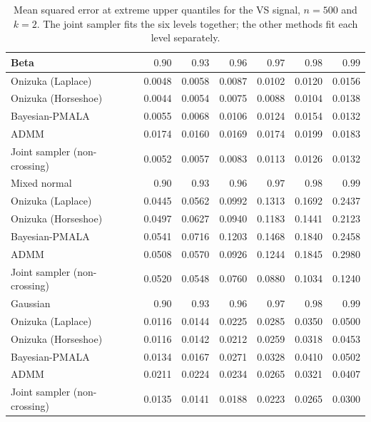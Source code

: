 \begin{table}[!htbp]
\centering
\small
\caption{Mean squared error at extreme upper quantiles for the VS signal, $n=500$ and $k=2$. The joint sampler fits the six levels together; the other methods fit each level separately.}
\label{tab:vs_ext_upper_mse}
\begin{tabular}{lrrrrrr}
\toprule
Beta & $0.90$ & $0.93$ & $0.96$ & $0.97$ & $0.98$ & $0.99$ \\
\midrule
Onizuka (Laplace) & 0.0048 & 0.0058 & 0.0087 & 0.0102 & 0.0120 & 0.0156 \\
Onizuka (Horseshoe) & 0.0044 & 0.0054 & 0.0075 & 0.0088 & 0.0104 & 0.0138 \\
Bayesian-PMALA & 0.0055 & 0.0068 & 0.0106 & 0.0124 & 0.0154 & 0.0132 \\
ADMM & 0.0174 & 0.0160 & 0.0169 & 0.0174 & 0.0199 & 0.0183 \\
Joint sampler (non-crossing) & 0.0052 & 0.0057 & 0.0083 & 0.0113 & 0.0126 & 0.0132 \\
\midrule
Mixed normal & $0.90$ & $0.93$ & $0.96$ & $0.97$ & $0.98$ & $0.99$ \\
\midrule
Onizuka (Laplace) & 0.0445 & 0.0562 & 0.0992 & 0.1313 & 0.1692 & 0.2437 \\
Onizuka (Horseshoe) & 0.0497 & 0.0627 & 0.0940 & 0.1183 & 0.1441 & 0.2123 \\
Bayesian-PMALA & 0.0541 & 0.0716 & 0.1203 & 0.1468 & 0.1840 & 0.2458 \\
ADMM & 0.0508 & 0.0570 & 0.0926 & 0.1244 & 0.1845 & 0.2980 \\
Joint sampler (non-crossing) & 0.0520 & 0.0548 & 0.0760 & 0.0880 & 0.1034 & 0.1240 \\
\midrule
Gaussian & $0.90$ & $0.93$ & $0.96$ & $0.97$ & $0.98$ & $0.99$ \\
\midrule
Onizuka (Laplace) & 0.0116 & 0.0144 & 0.0225 & 0.0285 & 0.0350 & 0.0500 \\
Onizuka (Horseshoe) & 0.0116 & 0.0142 & 0.0212 & 0.0259 & 0.0318 & 0.0453 \\
Bayesian-PMALA & 0.0134 & 0.0167 & 0.0271 & 0.0328 & 0.0410 & 0.0502 \\
ADMM & 0.0211 & 0.0224 & 0.0234 & 0.0265 & 0.0321 & 0.0407 \\
Joint sampler (non-crossing) & 0.0135 & 0.0141 & 0.0188 & 0.0223 & 0.0265 & 0.0300 \\
\bottomrule
\end{tabular}
\end{table}

